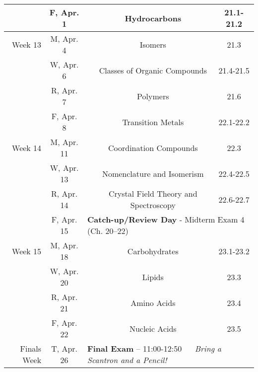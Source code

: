 \documentclass[12pt, letterpaper]{article}
\begin{document}
\begin{tabular}{rcccc}
	            & F, Apr. 1  &                                                                                                 & Hydrocarbons                          & 21.1-21.2 \\
	\midrule
	Week 13     & M, Apr. 4  &                                                                                                 & Isomers                               & 21.3      \\
	            & W, Apr. 6  &                                                                                                 & Classes of Organic Compounds          & 21.4-21.5 \\
	            & R, Apr. 7  &                                                                                                 & Polymers                              & 21.6      \\
	            & F, Apr. 8  &                                                                                                 & Transition Metals                     & 22.1-22.2 \\
	\midrule
	Week 14     & M, Apr. 11 &                                                                                                 & Coordination Compounds                & 22.3      \\
	            & W, Apr. 13 &                                                                                                 & Nomenclature and Isomerism            & 22.4-22.5 \\
	            & R, Apr. 14 &                                                                                                 & Crystal Field Theory and Spectroscopy & 22.6-22.7 \\
	            & F, Apr. 15 & \multicolumn{3}{l}{\textbf{Catch-up/Review Day} - Midterm Exam 4 (Ch. 20--22)}                                                                      \\
	\midrule
	Week 15     & M, Apr. 18 &                                                                                                 & Carbohydrates                         & 23.1-23.2 \\
	            & W, Apr. 20 &                                                                                                 & Lipids                                & 23.3      \\
	            & R, Apr. 21 &                                                                                                 & Amino Acids                           & 23.4      \\
	            & F, Apr. 22 &                                                                                                 & Nucleic Acids                         & 23.5      \\
	\midrule
	\midrule
	Finals Week & T, Apr. 26 & \multicolumn{3}{l}{\textbf{Final Exam} -- 11:00-12:50 ~~ \emph{Bring a Scantron and a Pencil!}}                                                     \\
\end{tabular}
\end{document}
